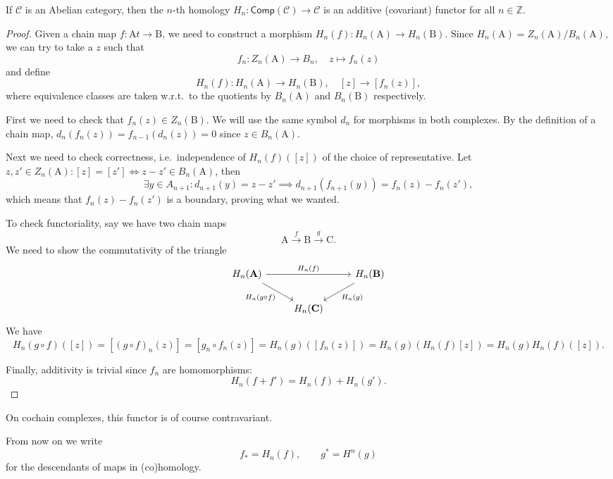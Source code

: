 \documentclass[english,letterpaper]{article}%
\numberwithin{equation}{section}
\numberwithin{figure}{section}
\numberwithin{table}{section}
\theoremstyle{definition}
\theoremstyle{definition}
\theoremstyle{definition}
\theoremstyle{plain}
\theoremstyle{plain}
\theoremstyle{plain}
\theoremstyle{plain}
\theoremstyle{remark}
\theoremstyle{remark}
\newcommand{\bbZ}{\mathbb{Z}}
\newcommand{\calC}{\mathcal{C}}
\newcommand{\bm}[1]{\boldsymbol{\mathrm{#1}}}
\begin{document}
\begin{prop}
    If $\calC$ is an Abelian category, then the $n$-th homology $H_n:\mathsf{Comp}(\calC)\to \calC$ is an additive (covariant) functor for all $n\in \bbZ$.
\end{prop}
\begin{proof}
    Given a chain map $f:\bm{A}t\to \bm{B}$, we need to construct a morphism $H_n(f):H_n(\bm{A})\to H_n(\bm{B})$. Since $H_n(\bm{A})=Z_n(\bm{A})/B_n(\bm{A})$, we can try to take a $z$ such that
    \[f_n:Z_n(\bm{A})\to B_n,\quad z\mapsto f_n(z)\]
    and define
    \[H_n(f):H_n(\bm{A})\to H_n(\bm{B}),\quad [z]\to \left[f_n(z)\right],\]
    where equivalence classes are taken w.r.t.\ to the quotients by $B_n(\bm{A})$ and $B_n(\bm{B})$ respectively.
    
    First we need to check that $f_n(z)\in Z_n(\bm{B})$. We will use the same symbol $d_n$ for morphisms in both complexes. By the definition of a chain map, $d_n(f_n(z))=f_{n-1}(d_n(z))=0$ since $z\in B_n(\bm{A})$.
    
    Next we need to check correctness, i.e.\ independence of $H_n(f)([z])$ of the choice of representative. Let $z,z'\in Z_n(\bm{A}):[z]=[z']\Leftrightarrow z-z'\in B_n(\bm{A})$, then
    \[\exists y\in A_{n+1}: d_{n+1}(y)=z-z'\implies d_{n+1}(f_{n+1}(y))=f_n(z)-f_n(z'),\]
    which means that $f_n(z)-f_n(z')$ is a boundary, proving what we wanted.
    
    To check functoriality, say we have two chain maps
    \[\bm{A}\overset f\to \bm{B}\overset g\to \bm{C}.\]
    We need to show the commutativity of the triangle
    \[
    \begin{tikzcd}
        H_n(\bm{A}) \arrow[rr,"H_n(f)"]\arrow[dr,swap,"H_n(g\circ f)"]&& H_n(\bm{B})\arrow[dl,"H_n(g)"]\\
        & H_n(\bm{C}) &
    \end{tikzcd}
    \]
    We have 
    \[H_n(g\circ f)([z])=\left[(g\circ f)_n(z)\right]=\left[g_n\circ f_n(z)\right]=H_n(g)\left(\left[f_n(z)\right]\right)=H_n(g)\left(H_n(f)[z]\right)=H_n(g)H_n(f)([z]).\]
    
    Finally, additivity is trivial since $f_n$ are homomorphisms:
    \[H_n(f+f')=H_n(f)+H_n(g').\]
\end{proof}

\begin{rem}
    On cochain complexes, this functor is of course contravariant.
\end{rem}

From now on we write
\[f_\ast=H_n(f),\quad\quad g^\ast=H^n(g)\]
for the descendants of maps in (co)homology.
\end{document}
